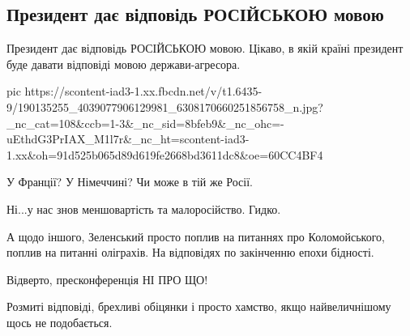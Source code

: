  
 
 
 
 
\subsection{Президент дає відповідь РОСІЙСЬКОЮ мовою}

Президент дає відповідь РОСІЙСЬКОЮ мовою. Цікаво, в якій країні президент буде
давати відповіді мовою держави-агресора. 


\ifcmt
  pic https://scontent-iad3-1.xx.fbcdn.net/v/t1.6435-9/190135255_4039077906129981_6308170660251856758_n.jpg?_nc_cat=108&ccb=1-3&_nc_sid=8bfeb9&_nc_ohc=-uEthdG3PrIAX_M1l7r&_nc_ht=scontent-iad3-1.xx&oh=91d525b065d89d619fe2668bd3611dc8&oe=60CC4BF4
\fi


У Франції? У Німеччині? Чи може в тій же Росії. 

Ні...у нас знов меншовартість та малоросійство. Гидко.

А щодо іншого, Зеленський просто поплив на питаннях про Коломойського, поплив
на питанні оліграхів. На відповідях по закінченню епохи бідності. 

Відверто, пресконференція НІ ПРО ЩО! 

Розмиті відповіді, брехливі обіцянки і просто хамство, якщо найвеличнішому щось
не подобається.
